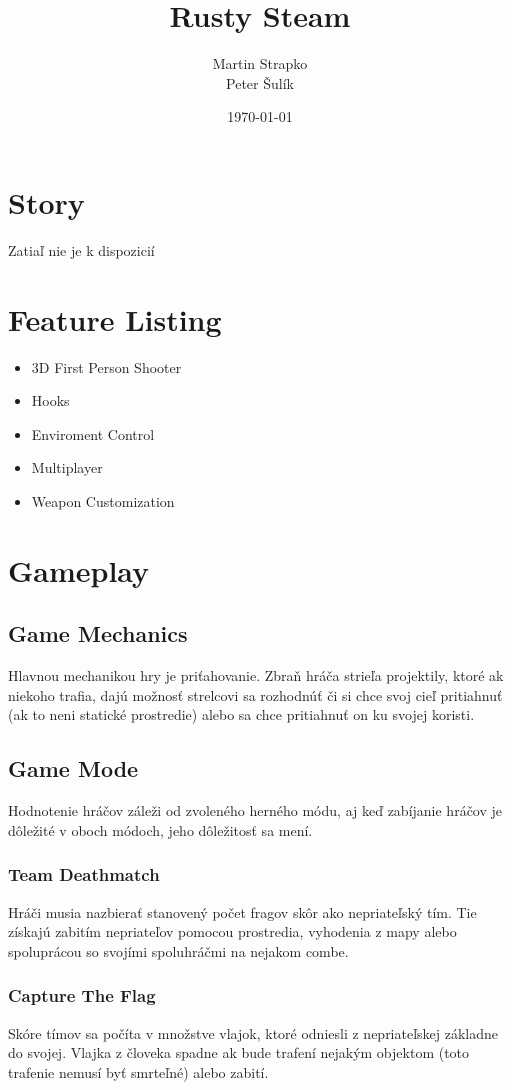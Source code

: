 \documentclass[a4paper]{report}
\title{Rusty Steam}
\author{Martin Strapko \\ Peter Šulík}
\date{\today}
\begin{document}
\maketitle

\tableofcontents
 
\chapter{Story}
Zatiaľ nie je k dispozicií
 
\chapter{Feature Listing}
\begin{itemize}
  \item 3D First Person Shooter
  \item Hooks
  \item Enviroment Control
  \item Multiplayer
  \item Weapon Customization
\end{itemize}

\chapter{Gameplay}
\section{Game Mechanics}
Hlavnou mechanikou hry je priťahovanie. Zbraň hráča strieľa projektily, ktoré ak niekoho trafia, dajú možnosť strelcovi sa rozhodnúť či si chce svoj cieľ pritiahnuť (ak to neni statické prostredie) alebo sa chce pritiahnuť on ku svojej koristi.

\section{Game Mode}
Hodnotenie hráčov záleži od zvoleného herného módu, aj keď zabíjanie hráčov je dôležité v oboch módoch, jeho dôležitosť sa mení.
\subsection{Team Deathmatch}
Hráči musia nazbierať stanovený počet fragov skôr ako nepriateľský tím. Tie získajú zabitím nepriateľov pomocou prostredia, vyhodenia z mapy alebo spoluprácou so svojími spoluhráčmi na nejakom combe.

\subsection{Capture The Flag}
Skóre tímov sa počíta v množstve vlajok, ktoré odniesli z nepriateľskej základne do svojej. Vlajka z človeka spadne ak bude trafení nejakým objektom (toto trafenie nemusí byť smrteľné) alebo zabití.
 
\end{document}
